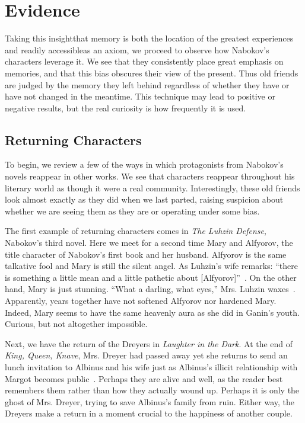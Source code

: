 \section{Evidence} %
\label{evidence}

Taking this insight\textemdash that memory is both the location of the greatest experiences and readily accessible\textemdash as an axiom, we proceed to observe how Nabokov's characters leverage it.
We see that they consistently place great emphasis on memories, and that this bias obscures their view of the present. 
Thus old friends are judged by the memory they left behind regardless of whether they have or have not changed in the meantime.
This technique may lead to positive or negative results, but the real curiosity is how frequently it is used.

\vspace{1cm}
\subsection{Returning Characters}
To begin, we review a few of the ways in which protagonists from Nabokov's novels reappear in other works.
We see that characters reappear throughout his literary world as though it were a real community.
Interestingly, these old friends look almost exactly as they did when we last parted, raising suspicion about whether we are seeing them as they are or operating under some bias.

The first example of returning characters comes in \emph{The Luhzin Defense}, Nabokov's third novel. 
Here we meet for a second time Mary and Alfyorov, the title character of Nabokov's first book and her husband.
Alfyorov is the same talkative fool and Mary is still the silent angel.
As Luhzin's wife remarks: ``there is something a little mean and a little pathetic about [Alfyorov]''~\cite[The Defense, 152]{defense}.
On the other hand, Mary is just stunning.
``What a darling, what eyes,'' Mrs. Luhzin waxes~\cite[The Defense, 152]{defense}.
Apparently, years together have not softened Alfyorov nor hardened Mary. 
Indeed, Mary seems to have the same heavenly aura as she did in Ganin's youth. 
Curious, but not altogether impossible.

Next, we have the return of the Dreyers in \emph{Laughter in the Dark}. 
At the end of \emph{King, Queen, Knave}, Mrs. Dreyer had passed away yet she returns to send an lunch invitation to Albinus and his wife just as Albinus's illicit relationship with Margot becomes public~\cite[86]{nabokov1960laughter}.
Perhaps they are alive and well, as the reader best remembers them rather than how they actually wound up.
Perhaps it is only the ghost of Mrs. Dreyer, trying to save Albinus's family from ruin.
Either way, the Dreyers make a return in a moment crucial to the happiness of another couple.

